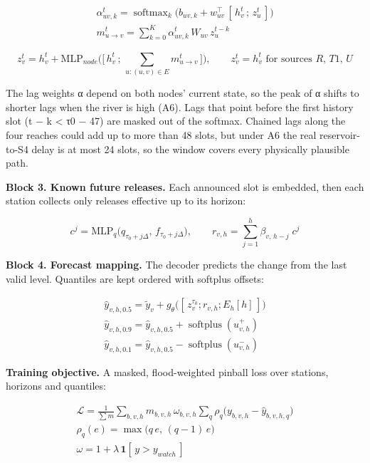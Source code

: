 \documentclass[11pt]{article}
\begin{document}
\[
\begin{gathered}
\alpha_{uv,k}^t = \operatorname{softmax}_k\!\Big(b_{uv,k} + w_{uv}^{\top}\,[\,h_v^t \,;\, z_u^t\,]\Big) \\ m_{u\to v}^t = \sum_{k=0}^{K} \alpha_{uv,k}^t\, W_{uv}\, z_u^{t-k}
\end{gathered}
\]

\[
z_v^t = h_v^t + \mathrm{MLP}_{node}\Big(\big[\,h_v^t \,;\, \textstyle\sum_{u:(u,v)\in E} m_{u\to v}^t\,\big]\Big), \qquad z_v^t = h_v^t \text{ for sources } R,\,T1,\,U
\]

The lag weights α depend on both nodes' current state, so the peak of α shifts to shorter lags when the river is high (A6). Lags that point before the first history slot (t − k \textless{} τ0 − 47) are masked out of the softmax. Chained lags along the four reaches could add up to more than 48 slots, but under A6 the real reservoir-to-S4 delay is at most 24 slots, so the window covers every physically plausible path.

\textbf{Block 3. Known future releases.} Each announced slot is embedded, then each station collects only releases effective up to its horizon:

\[
c^j = \mathrm{MLP}_q\big(\hat q_{\tau_0+j\Delta},\, f_{\tau_0+j\Delta}\big), \qquad r_{v,h} = \sum_{j=1}^{h} \beta_{v,\,h-j}\; c^j
\]

\textbf{Block 4. Forecast mapping.} The decoder predicts the change from the last valid level. Quantiles are kept ordered with softplus offsets:

\[
\begin{gathered}
\hat y_{v,h,0.5} = \tilde y_v + g_\theta\big([\,z_v^{\tau_0} ; r_{v,h} ; E_h[h]\,]\big) \\ \hat y_{v,h,0.9} = \hat y_{v,h,0.5} + \operatorname{softplus}(u^{+}_{v,h}) \\ \hat y_{v,h,0.1} = \hat y_{v,h,0.5} - \operatorname{softplus}(u^{-}_{v,h})
\end{gathered}
\]

\textbf{Training objective.} A masked, flood-weighted pinball loss over stations, horizons and quantiles:

\[
\begin{gathered}
\mathcal{L} = \frac{1}{\sum m}\sum_{b,v,h} m_{b,v,h}\,\omega_{b,v,h} \sum_{q} \rho_q\big(y_{b,v,h} - \hat y_{b,v,h,q}\big) \\ \rho_q(e) = \max\big(q\,e,\,(q-1)\,e\big) \\ \omega = 1 + \lambda\,\mathbf{1}[\,y > y_{watch}\,]
\end{gathered}
\]
\end{document}
